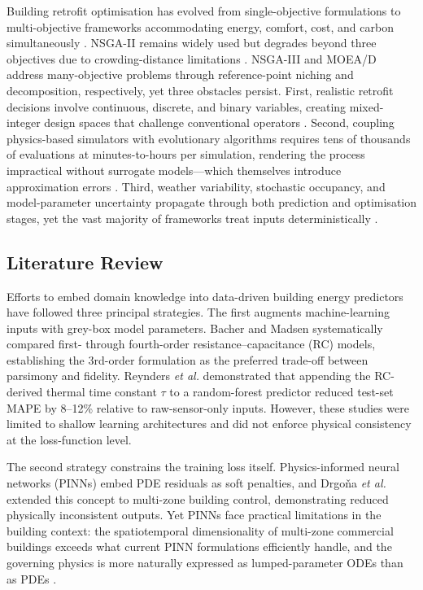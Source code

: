 \documentclass[11pt]{article}
\begin{document}
Building retrofit optimisation has evolved from single-objective formulations \cite{25} to multi-objective frameworks accommodating energy, comfort, cost, and carbon simultaneously \cite{26,27}. NSGA-II \cite{28} remains widely used but degrades beyond three objectives due to crowding-distance limitations \cite{29}. NSGA-III \cite{30} and MOEA/D \cite{31} address many-objective problems through reference-point niching and decomposition, respectively, yet three obstacles persist. First, realistic retrofit decisions involve continuous, discrete, and binary variables, creating mixed-integer design spaces that challenge conventional operators \cite{32}. Second, coupling physics-based simulators with evolutionary algorithms requires tens of thousands of evaluations at minutes-to-hours per simulation, rendering the process impractical without surrogate models---which themselves introduce approximation errors \cite{33}. Third, weather variability, stochastic occupancy, and model-parameter uncertainty propagate through both prediction and optimisation stages, yet the vast majority of frameworks treat inputs deterministically \cite{34,35}.

\subsection{Literature Review}

Efforts to embed domain knowledge into data-driven building energy predictors have followed three principal strategies. The first augments machine-learning inputs with grey-box model parameters. Bacher and Madsen \cite{14} systematically compared first- through fourth-order resistance--capacitance (RC) models, establishing the 3rd-order formulation as the preferred trade-off between parsimony and fidelity. Reynders \emph{et al.} \cite{13} demonstrated that appending the RC-derived thermal time constant $\tau$ to a random-forest predictor reduced test-set MAPE by 8--12\% relative to raw-sensor-only inputs. However, these studies were limited to shallow learning architectures and did not enforce physical consistency at the loss-function level.

The second strategy constrains the training loss itself. Physics-informed neural networks (PINNs) \cite{36} embed PDE residuals as soft penalties, and Drgo\v{n}a \emph{et al.} \cite{37} extended this concept to multi-zone building control, demonstrating reduced physically inconsistent outputs. Yet PINNs face practical limitations in the building context: the spatiotemporal dimensionality of multi-zone commercial buildings exceeds what current PINN formulations efficiently handle, and the governing physics is more naturally expressed as lumped-parameter ODEs than as PDEs \cite{38}.
\end{document}

